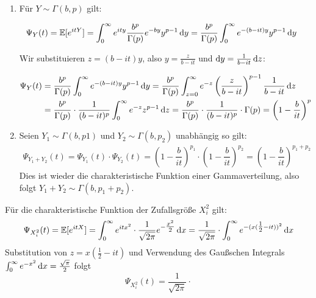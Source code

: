 \begin{loesung}
    \begin{enumerate}
        \item 
        Für $Y \sim \Gamma(b,p)$ gilt:

        \begin{align*}
            \Psi_Y(t) 
            &= \mathbb E[e^{itY}] 
            = \int_{0}^{\infty} e^{ity} \frac{b^p}{\Gamma(p)} e^{-by} y^{p-1} \mathop{}\!\mathrm{d} y 
            = \frac{b^p}{\Gamma(p)} \int_{0}^{\infty} e^{-(b-it)y} y^{p-1} \mathop{}\!\mathrm{d} y
        \end{align*}

        Wir substituieren $z = (b-it)y$, also $y = \frac{z}{b-it}$ und $\mathop{}\!\mathrm{d} y = \frac{1}{b-it}\mathop{}\!\mathrm{d} z$:

        \begin{align*}
            \Psi_Y(t) &=
            \frac{b^p}{\Gamma(p)}\int_{0}^{\infty} e^{-(b-it)y} y^{p-1} \mathop{}\!\mathrm{d} y
            = \frac{b^p}{\Gamma(p)}\int_{z=0}^{\infty} e^{-z} \left(\frac{z}{b-it}\right)^{p-1} \frac{1}{b-it} \mathop{}\!\mathrm{d} z \\
            &= \frac{b^p}{\Gamma(p)}\cdot\frac{1}{(b-it)^p} \int_{0}^{\infty} e^{-z} z^{p-1} \mathop{}\!\mathrm{d} z 
            = \frac{b^p}{\Gamma(p)}\cdot\frac{1}{(b-it)^p}\cdot \Gamma(p)
            = \left(1-\dfrac{b}{it}\right)^p
        \end{align*}
        \item Seien $Y_1\sim \Gamma(b,p1)$ und $Y_2\sim \Gamma(b,p_2)$ unabhängig so gilt:
        \begin{align*}
            \Psi_{Y_1+Y_2}(t) 
            = \Psi_{Y_1}(t)\cdot\Psi_{Y_2}(t) 
            = \left(1-\dfrac{b}{it}\right)^{p_1}\cdot\left(1-\dfrac{b}{it}\right)^{p_2}
            = \left(1-\dfrac{b}{it}\right)^{p_1+p_2}
        \end{align*}
        Dies ist wieder die charakteristische Funktion einer Gammaverteilung, also folgt $Y_1+Y_2\sim\Gamma(b,p_1+p_2)$.
    \end{enumerate}
\end{loesung}

\begin{loesung}
    Für die charakteristische Funktion der Zufallsgröße $X_i^2$ gilt:
    \begin{align*}
        \Psi_{X_i^2}(t) 
        = \mathbb E[e^{itX}] 
        = \int_{0}^{\infty} e^{itx^2}\cdot\dfrac{1}{\sqrt{2\pi}} e^{-\tfrac{x^2}{2}} \mathop{}\!\mathrm{d} x
        = \dfrac{1}{\sqrt{2\pi}}\cdot\int_{0}^{\infty} e^{-(x(\tfrac{1}{2}-it))^2} \mathop{}\!\mathrm{d} x
    \end{align*}
    Substitution von $z=x(\tfrac{1}{2}-it)$ und Verwendung des Gaußschen Integrals 
    $\int_{0}^{\infty}e^{-x^2}\mathop{}\!\mathrm{d} x = \tfrac{\sqrt{\pi}}{2}$ folgt
    \[
        \Psi_{X_i^2}(t) = \dfrac{1}{\sqrt{2\pi}}\cdot
    \]
\end{loesung}